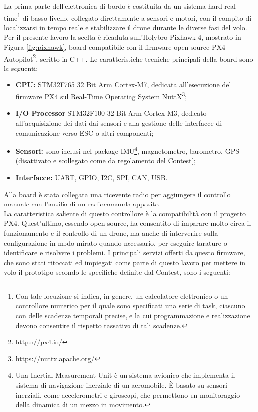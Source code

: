 \indent La prima parte dell'elettronica di bordo è costituita da un sistema hard real-time\footnote{Con tale locuzione si indica, in genere, un calcolatore elettronico o un controllore numerico per il quale sono specificati una serie di task, ciascuno con delle scadenze temporali precise, e la cui programmazione e realizzazione devono consentire il rispetto tassativo di tali scadenze.} di basso livello, collegato direttamente a sensori e motori, con il compito di localizzarsi in tempo reale e stabilizzare il drone durante le diverse fasi del volo. Per il presente lavoro la scelta è ricaduta sull'Holybro Pixhawk 4, mostrato in Figura \ref{fig:pixhawk}, board compatibile con il firmware open-source PX4 Autopilot\footnote{https://px4.io/}, scritto in C++. Le caratteristiche tecniche principali della board sono le seguenti:
\begin{itemize}
    \item \textbf{CPU:} STM32F765 32 Bit Arm Cortex-M7, dedicata all'esecuzione del firmware PX4 sul Real-Time Operating System NuttX\footnote{https://nuttx.apache.org/};
    \item \textbf{I/O Processor} STM32F100 32 Bit Arm Cortex-M3, dedicato all'acquisizione dei dati dai sensori e alla gestione delle interfacce di comunicazione verso ESC o altri componenti;
    \vfil\clearpage
    \item \textbf{Sensori:} sono inclusi nel package IMU\footnote{Una Inertial Measurement Unit è un sistema avionico che implementa il sistema di navigazione inerziale di un aeromobile. È basato su sensori inerziali, come accelerometri e giroscopi, che permettono un monitoraggio della dinamica di un mezzo in movimento.}, magnetometro, barometro, GPS (disattivato e scollegato come da regolamento del Contest);
    \item \textbf{Interfacce:} UART, GPIO, I2C, SPI, CAN, USB.
\end{itemize}
Alla board è stata collegata una ricevente radio per aggiungere il controllo manuale con l'ausilio di un radiocomando apposito.\\
La caratteristica saliente di questo controllore è la compatibilità con il progetto PX4. Quest'ultimo, essendo open-source, ha consentito di imparare molto circa il funzionamento e il controllo di un drone, ma anche di intervenire sulla configurazione in modo mirato quando necessario, per eseguire tarature o identificare e risolvere i problemi. I principali servizi offerti da questo firmware, che sono stati ritoccati ed impiegati come parte di questo lavoro per mettere in volo il prototipo secondo le specifiche definite dal Contest, sono i seguenti:
